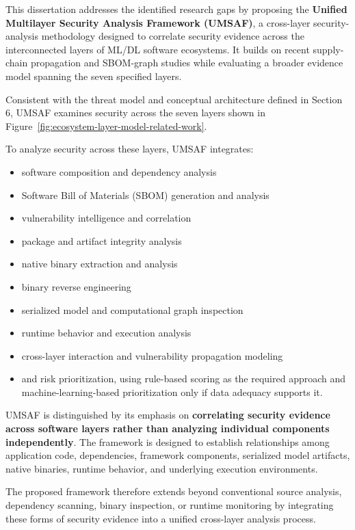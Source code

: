\documentclass[
  12pt,
  letterpaper,
  oneside]{report}
\providecommand{\tightlist}{%
  \setlength{\itemsep}{0pt}\setlength{\parskip}{0pt}}
\begin{document}
This dissertation addresses the identified research gaps by proposing
the \textbf{Unified Multilayer Security Analysis Framework (UMSAF)}, a
cross-layer security-analysis methodology designed to correlate security
evidence across the interconnected layers of ML/DL software ecosystems.
It builds on recent supply-chain propagation and SBOM-graph studies while
evaluating a broader evidence model spanning the seven specified layers.
\cite{zhou2025unraveling,baird2026attackchains}

Consistent with the threat model and conceptual architecture defined in
Section 6, UMSAF examines security across the seven layers shown in
Figure~\ref{fig:ecosystem-layer-model-related-work}.

To analyze security across these layers, UMSAF integrates:

\begin{itemize}
\tightlist
\item
  software composition and dependency analysis
\item
  Software Bill of Materials (SBOM) generation and analysis
\item
  vulnerability intelligence and correlation
\item
  package and artifact integrity analysis
\item
  native binary extraction and analysis
\item
  binary reverse engineering
\item
  serialized model and computational graph inspection
\item
  runtime behavior and execution analysis
\item
  cross-layer interaction and vulnerability propagation modeling
\item
  and risk prioritization, using rule-based scoring as the required
  approach and machine-learning-based prioritization only if data
  adequacy supports it.
\end{itemize}

UMSAF is distinguished by its emphasis on \textbf{correlating security
evidence across software layers rather than analyzing individual
components independently}. The framework is designed to establish
relationships among application code, dependencies, framework
components, serialized model artifacts, native binaries, runtime
behavior, and underlying execution environments.

The proposed framework therefore extends beyond conventional source
analysis, dependency scanning, binary inspection, or runtime monitoring
by integrating these forms of security evidence into a unified
cross-layer analysis process.
\end{document}
